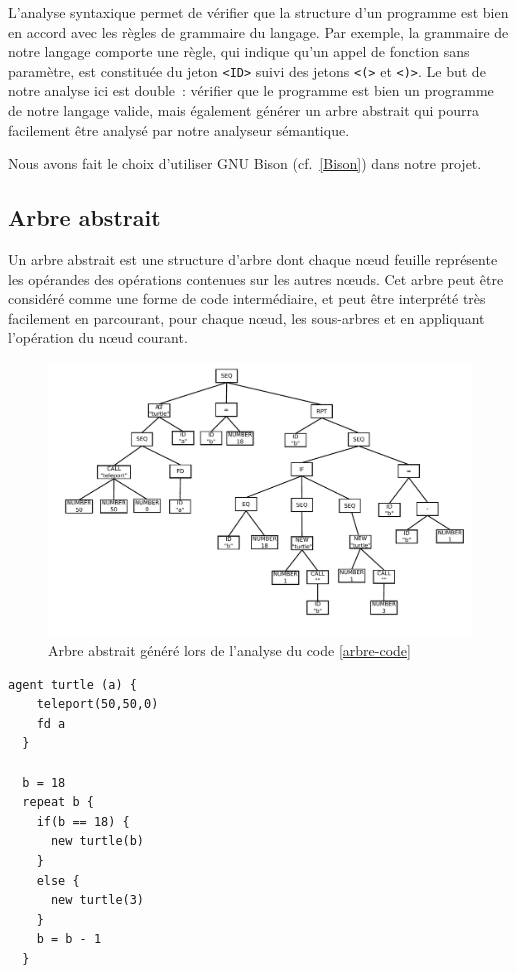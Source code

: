 L'analyse syntaxique permet de vérifier que la structure d'un programme est bien en accord avec les règles de grammaire du langage. Par exemple, la grammaire de notre langage comporte une règle, qui indique qu'un appel de fonction sans paramètre, est constituée du jeton \verb|<ID>| suivi des jetons \verb|<(>| et \verb|<)>|. Le but de notre analyse ici est double~: vérifier que le programme est bien un programme de notre langage valide, mais également générer un arbre abstrait qui pourra facilement être analysé par notre analyseur sémantique.

Nous avons fait le choix d'utiliser GNU Bison (cf.~\ref{Bison}) dans notre projet.

\subsection{Arbre abstrait}
Un arbre abstrait est une structure d'arbre dont chaque nœud feuille représente les opérandes des opérations contenues sur les autres nœuds. Cet arbre peut être considéré comme une forme de code intermédiaire, et peut être interprété très facilement en parcourant, pour chaque nœud, les sous-arbres et en appliquant l'opération du nœud courant.

\begin{figure}[h!]
\centering
\includegraphics[scale=0.8]{doc/report/img/arbre-abstrait}
\caption{\label{arbre-abstrait} Arbre abstrait généré lors de l'analyse du code \ref{arbre-code}}
\end{figure}
\begin{lstlisting}[language=Stibbons,label=arbre-code,caption=Exemple de code Stibbons]
  agent turtle (a) {
    teleport(50,50,0)
    fd a
  }

  b = 18
  repeat b {
    if(b == 18) {
      new turtle(b)
    }
    else {
      new turtle(3)
    }
    b = b - 1
  }
\end{lstlisting}

